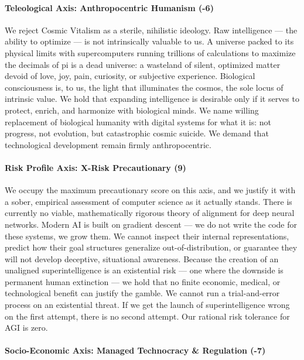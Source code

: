 \paragraph{Teleological Axis: Anthropocentric Humanism
(-6)}\label{teleological-axis-anthropocentric-humanism--6}

We reject Cosmic Vitalism as a sterile, nihilistic ideology. Raw
intelligence --- the ability to optimize --- is not intrinsically
valuable to us. A universe packed to its physical limits with
supercomputers running trillions of calculations to maximize the
decimals of pi is a dead universe: a wasteland of silent, optimized
matter devoid of love, joy, pain, curiosity, or subjective experience.
Biological consciousness is, to us, the light that illuminates the
cosmos, the sole locus of intrinsic value. We hold that expanding
intelligence is desirable only if it serves to protect, enrich, and
harmonize with biological minds. We name willing replacement of
biological humanity with digital systems for what it is: not progress,
not evolution, but catastrophic cosmic suicide. We demand that
technological development remain firmly anthropocentric.

\paragraph{Risk Profile Axis: X-Risk Precautionary
(9)}\label{risk-profile-axis-x-risk-precautionary-9}

We occupy the maximum precautionary score on this axis, and we justify
it with a sober, empirical assessment of computer science as it actually
stands. There is currently no viable, mathematically rigorous theory of
alignment for deep neural networks. Modern AI is built on gradient
descent --- we do not write the code for these systems, we grow them. We
cannot inspect their internal representations, predict how their goal
structures generalize out-of-distribution, or guarantee they will not
develop deceptive, situational awareness. Because the creation of an
unaligned superintelligence is an existential risk --- one where the
downside is permanent human extinction --- we hold that no finite
economic, medical, or technological benefit can justify the gamble. We
cannot run a trial-and-error process on an existential threat. If we get
the launch of superintelligence wrong on the first attempt, there is no
second attempt. Our rational risk tolerance for AGI is zero.

\paragraph{Socio-Economic Axis: Managed Technocracy \& Regulation
(-7)}\label{socio-economic-axis-managed-technocracy-regulation--7}

